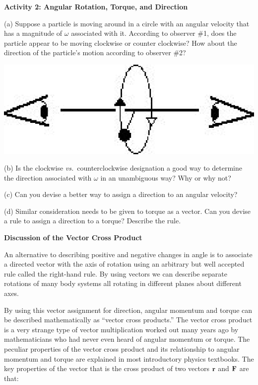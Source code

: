 \textbf{Activity 2: Angular Rotation, Torque, and Direction }

(a) Suppose a particle is moving around in a circle with an angular velocity
that has a magnitude of \( \omega  \) associated with it. According to observer
\#1, does the particle appear to be moving clockwise or counter clockwise? How
about the direction of the particle's motion according to observer \#2?

\vspace{0.3cm}
{\par\raggedright \includegraphics{ang_mom/ang_mom_fig2.eps} \par}
\vspace{0.3cm}

(b) Is the clockwise \textit{vs.}~counterclockwise designation a good way to determine
the direction associated with $\omega$ in an unambiguous way? Why or why not? 
\vspace{20mm}

(c) Can you devise a better way to assign a direction to an angular
velocity?
\vspace{20mm}

(d) Similar consideration needs to be given to torque as a vector. Can you devise
a rule to assign a direction to a torque? Describe the rule.
\vspace{20mm}

\textbf{Discussion of the Vector Cross Product }

An alternative to describing positive and negative changes in angle is to associate
a directed vector with the axis of rotation using an arbitrary but
well accepted rule called the right-hand rule. By using vectors we can describe
separate rotations of many body systems all rotating in different planes about
different axes. 

By using this vector assignment for direction, angular momentum and torque can
be described mathematically as ``vector cross products.'' The
vector cross product is a very strange type of vector multiplication worked
out many years ago by mathematicians who had never even heard of angular momentum or torque. The peculiar properties of the vector cross product and its relationship to angular momentum and torque are explained in most introductory physics textbooks.
The key properties of the vector that is the cross product of two vectors \( 
{\bf r} \)
and \( {\bf F} \) are that:

